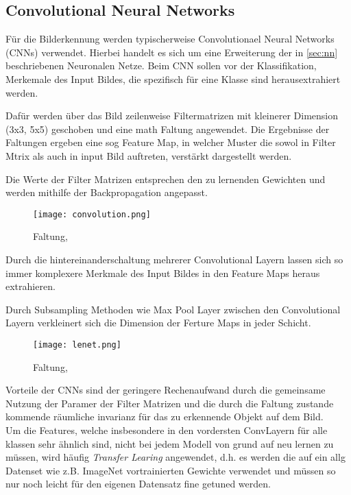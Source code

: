 \subsection{Convolutional Neural Networks}\label{subsec:cnn}

Für die Bilderkennung werden typischerweise Convolutionael 
Neural Networks (CNNs) verwendet. Hierbei handelt es sich um eine Erweiterung
der in \ref{sec:nn} beschriebenen Neuronalen Netze. Beim CNN 
sollen vor der Klassifikation, Merkemale des Input Bildes,
die spezifisch für eine Klasse sind herausextrahiert werden.

Dafür werden über das Bild zeilenweise Filtermatrizen mit kleinerer Dimension
(3x3, 5x5) geschoben und eine math Faltung angewendet.
Die Ergebnisse der Faltungen ergeben eine sog Feature Map, in welcher 
Muster die sowol in Filter Mtrix als auch in input Bild auftreten, verstärkt 
dargestellt werden.

Die Werte der Filter Matrizen entsprechen den zu lernenden Gewichten 
und werden mithilfe der Backpropagation angepasst.

\begin{figure}[htb]
    \centering
    \label{fig:conv}
    \texttt{[image: convolution.png]}
    \caption{Faltung, \cite{researcherSimpleIntroductionConvolutional2019}}
\end{figure}



Durch die hintereinanderschaltung mehrerer Convolutional Layern 
lassen sich so immer komplexere Merkmale des Input Bildes in den 
Feature Maps heraus extrahieren.

Durch Subsampling Methoden wie Max Pool Layer zwischen den Convolutional
Layern verkleinert sich die Dimension der Ferture Maps in jeder Schicht.


\begin{figure}[htb]
    \centering
    \label{fig:lenet}
    \texttt{[image: lenet.png]}
    \caption{Faltung, \cite{lecunGradientBasedLearningApplied1998}}
\end{figure}


Vorteile der CNNs sind der geringere Rechenaufwand durch die gemeinsame 
Nutzung der Paramer der Filter Matrizen und die durch die 
Faltung zustande kommende räumliche invarianz für das zu erkennende 
Objekt auf dem Bild.
\\
Um die Features, welche insbesondere in den vordersten ConvLayern für 
alle klassen sehr ähnlich sind, nicht bei jedem Modell von grund auf 
neu lernen zu müssen, wird häufig \textit{Transfer Learing} angewendet, 
d.h. es werden die auf ein allg Datenset wie z.B. ImageNet vortrainierten
Gewichte verwendet und müssen so nur noch leicht für den eigenen Datensatz 
fine getuned werden.


